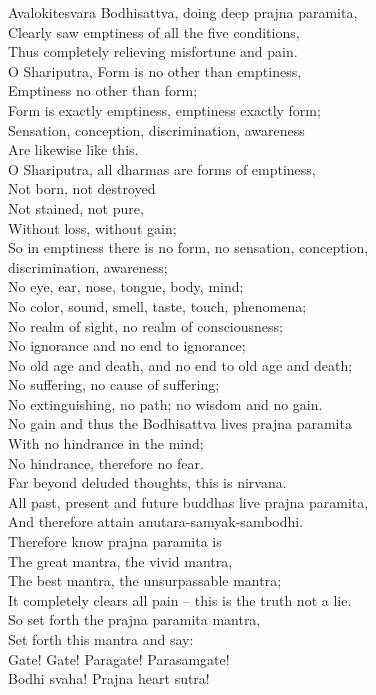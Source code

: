 \documentclass[12pt]{report}
\begin{document}
Avalokitesvara Bodhisattva, doing deep prajna paramita,\\
Clearly saw emptiness of all the five conditions,\\
Thus completely relieving misfortune and pain.\\
O Shariputra, Form is no other than emptiness,\\
Emptiness no other than form;\\
Form is exactly emptiness, emptiness exactly form;\\
Sensation, conception, discrimination, awareness\\
Are likewise like this.\\
O Shariputra, all dharmas are forms of emptiness,\\
Not born, not destroyed\\
Not stained, not pure,\\
Without loss, without gain;\\
So in emptiness there is no form, no sensation, conception,\\
discrimination, awareness;\\
No eye, ear, nose, tongue, body, mind;\\
No color, sound, smell, taste, touch, phenomena;\\
No realm of sight, no realm of consciousness;\\
No ignorance and no end to ignorance;\\
No old age and death, and no end to old age and death;\\
No suffering, no cause of suffering;\\
No extinguishing, no path; no wisdom and no gain.\\
No gain and thus the Bodhisattva lives prajna paramita\\
With no hindrance in the mind;\\
No hindrance, therefore no fear.\\
Far beyond deluded thoughts, this is nirvana.\\
All past, present and future buddhas live prajna paramita,\\
And therefore attain anutara-samyak-sambodhi.\\
Therefore know prajna paramita is\\
The great mantra, the vivid mantra,\\
The best mantra, the unsurpassable mantra;\\
It completely clears all pain -- this is the truth not a lie.\\
So set forth the prajna paramita mantra,\\
Set forth this mantra and say:\\
Gate! Gate! Paragate! Parasamgate!\\
Bodhi svaha! Prajna heart sutra!
\end{document}
